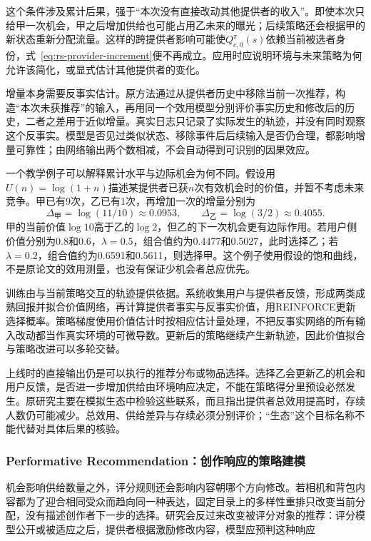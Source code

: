 这个条件涉及累计后果，强于“本次没有直接改动其他提供者的收入”。即使本次只给甲一次机会，甲之后增加供给也可能占用乙未来的曝光；后续策略还会根据甲的新状态重新分配流量。这样的跨提供者影响可能使$Q_{c,0}^\pi(s)$依赖当前被选者身份，式~\eqref{eq:rs-provider-increment}便不再成立。应用时应说明环境与未来策略为何允许该简化，或显式估计其他提供者的变化。

增量本身需要反事实估计。原方法通过从提供者历史中移除当前一次推荐，构造“本次未获推荐”的输入，再用同一个效用模型分别评价事实历史和修改后的历史，二者之差用于近似增量。真实日志只记录了实际发生的轨迹，并没有同时观察这个反事实。模型是否见过类似状态、移除事件后后续输入是否仍合理，都影响增量可靠性；由网络输出两个数相减，不会自动得到可识别的因果效应。

一个教学例子可以解释累计水平与边际机会为何不同。假设用$U(n)=\log(1+n)$描述某提供者已获$n$次有效机会时的价值，并暂不考虑未来竞争。甲已有9次，乙已有1次，再增加一次的增量分别为
\[
 \Delta_{\text{甲}}=\log(11/10)\approx0.0953,
 \qquad
 \Delta_{\text{乙}}=\log(3/2)\approx0.4055.
\]
甲的当前价值$\log10$高于乙的$\log2$，但乙的下一次机会更有边际作用。若用户侧价值分别为0.8和0.6，$\lambda=0.5$，组合值约为0.4477和0.5027，此时选择乙；若$\lambda=0.2$，组合值约为0.6591和0.5611，则选择甲。这个例子使用假设的饱和曲线，不是原论文的效用测量，也没有保证少机会者总应优先。

训练由与当前策略交互的轨迹提供依据。系统收集用户与提供者反馈，形成两类成熟回报并拟合价值网络，再计算提供者事实与反事实价值，用REINFORCE更新选择概率。策略梯度使用价值估计时按相应估计量处理，不把反事实网络的所有输入改动都当作真实环境的可微导数。更新后的策略继续产生新轨迹，因此价值拟合与策略改进可以多轮交替。

上线时的直接输出仍是可以执行的推荐分布或物品选择。选择乙会更新乙的机会和用户反馈，是否进一步增加供给由环境响应决定，不能在策略得分里预设必然发生。原研究主要在模拟生态中检验这些联系，而且指出提供者总效用提高时，存续人数仍可能减少。总效用、供给差异与存续必须分别评价；“生态”这个目标名称不能代替对具体后果的核验。

\subsubsection{Performative Recommendation：创作响应的策略建模}
\label{sec:rs-performative-recommendation}

机会影响供给数量之外，评分规则还会影响内容朝哪个方向修改。若相机和背包内容都为了迎合相同受众而趋向同一种表达，固定目录上的多样性重排只改变当前分配，没有描述创作者下一步的选择。研究会反过来改变被评分对象的推荐：评分模型公开或被适应之后，提供者根据激励修改内容，模型应预判这种响应

